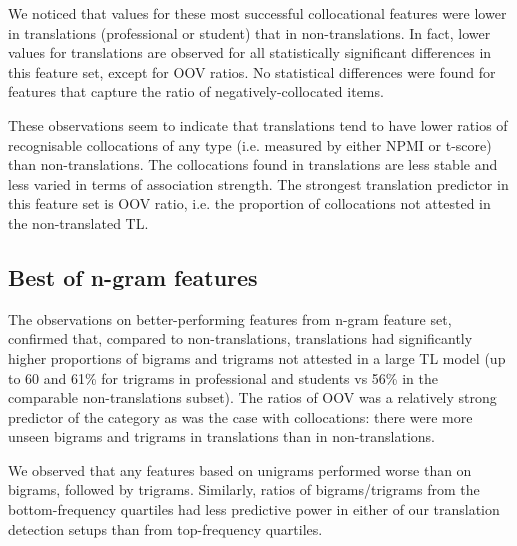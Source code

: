 We noticed that values for these most successful collocational features were lower in translations (professional or student) that in non-translations. In fact, lower values for translations are observed for all statistically significant differences in this feature set, except for OOV ratios. No statistical differences were found for features that capture the ratio of negatively-collocated items. 

These observations seem to indicate that translations tend to have lower ratios of recognisable collocations of any type (i.e. measured by either NPMI or t-score) than non-translations. The collocations found in translations are less stable and less varied in terms of association strength. The strongest translation predictor in this feature set is OOV ratio, i.e. the proportion of collocations not attested in the non-translated TL.

%
%

\subsection{\label{ssec:best_ngram}Best of n-gram features} 
The observations on better-performing features from n-gram feature set, confirmed that, compared to non-translations, translations had significantly higher proportions of bigrams and trigrams not attested in a large TL model (up to 60 and 61\% for trigrams in professional and students vs 56\% in the comparable non-translations subset). The ratios of OOV was a relatively strong predictor of the category as was the case with collocations: there were more unseen bigrams and trigrams in translations than in non-translations. %

We observed that any features based on unigrams performed worse than on bigrams, followed by trigrams. 
Similarly, ratios of bigrams/trigrams from the bottom-frequency quartiles had less predictive power in either of our translation detection setups than from top-frequency quartiles.

